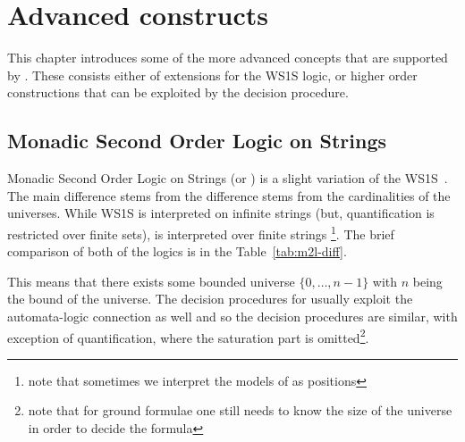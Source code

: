  
\chapter{Advanced constructs}
\begin{intro}

\end{intro}

This chapter introduces some of the more advanced concepts that are
supported by \gaston. These consists either of extensions for the
WS1S logic, or higher order constructions that can be exploited
by the decision procedure.

\section{Monadic Second Order Logic on Strings}\label{sec:m2l}
Monadic Second Order Logic on Strings (or \msl) is a slight variation
of the WS1S~\cite{m2l}. The main difference stems from the difference
stems from the cardinalities of the universes. While WS1S is
interpreted on infinite strings (but, quantification is restricted
over finite sets), \msl is interpreted over finite strings
\footnote{note that sometimes we interpret the models of \msl as
positions}. The brief comparison of both of the logics is in the
Table~\ref{tab:m2l-diff}.

This means that there exists some bounded universe $\{0,\ldots,n-1\}$
with $n$ being the bound of the universe. The decision procedures
for \msl usually exploit the automata-logic connection as well and
so the decision procedures are similar, with exception of 
quantification, where the saturation part is omitted\footnote{note
that for ground formulae one still needs to know the size of the
universe in order to decide the formula}.

